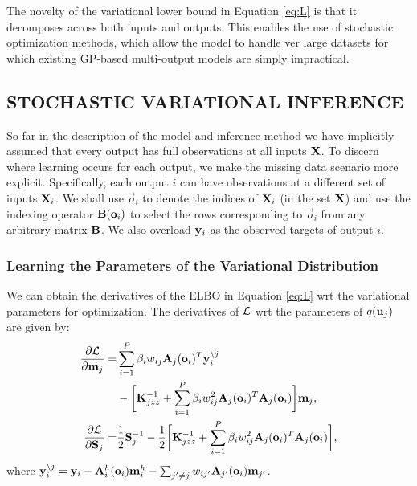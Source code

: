 The novelty of the  variational lower bound in Equation  \eqref{eq:L} is that it decomposes across both inputs and outputs.
This enables the use of stochastic optimization methods, which 
allow the model to handle  ver large datasets for which existing GP-based multi-output models are simply 
impractical.  
%
\subsection{STOCHASTIC VARIATIONAL INFERENCE \label{sec:svi}}
\newcommand{\oi}{\vec{o}_i}

So far in the description of the model and inference method we have
 implicitly assumed that every output has full observations at all inputs $\mathbf{X}$.
To discern where learning occurs for each output, we make the missing data scenario more explicit.
Specifically, each output $i$ can have observations at a different set of inputs $\mathbf{X}_i$. 
We shall use $\oi$ to denote the indices of $\mathbf{X}_i$ (in the set $\mathbf{X}$) and use the indexing operator $\B(\oi)$ to select the rows corresponding to $\oi$ from any arbitrary matrix $\mathbf{B}$.
We also overload $\mathbf{y}_i$ as the observed targets of output $i$. 
%
\subsubsection{Learning the Parameters of the Variational Distribution}
\newcommand{\Lgj}{\calL^g_j}
\newcommand{\ynoj}{\y_i^{\backslash j}}
\newcommand{\Kjzz}{\mat{K}_{jzz}}
 We can obtain the derivatives of the ELBO in Equation  \eqref{eq:L}
  wrt the variational parameters for optimization.
The derivatives of $\mathcal{L}$ wrt the parameters of $q(\mathbf{u}_j)$ are given by:
\begin{align}
\deriv{\calL}{\m_j} 
=& \sum_{i=1}^P \beta_i w_{ij} \A_j(\oi)^T \ynoj \\
\nonumber
&- \bigg[\Kjzz^{-1} + \sum_{i=1}^P \beta_i w_{ij}^2 \A_j(\oi)^T \A_j(\oi) \bigg] \m_j \text{,} \\
\deriv{\calL}{\S_j} 
=& \frac{1}{2} \S_j^{-1} - \frac{1}{2} \bigg[ \Kjzz^{-1} + \sum_{i=1}^P \beta_i w_{ij}^2 \A_j(\oi)^T \A_j(\oi) \bigg],
\end{align}
where $\y_i^{\backslash j} = \y_i - \Ahi(\oi) \mhi - \sum_{j' \neq j} w_{ij'} \A_{j'}(\oi) \m_{j'}$.

